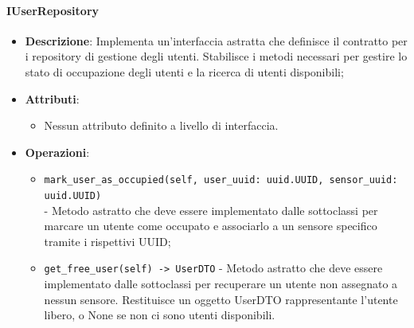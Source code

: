 \documentclass[10pt]{article}
\begin{document}
    \paragraph{IUserRepository}
    \begin{itemize} 
    \item \textbf{Descrizione}: Implementa un'interfaccia astratta che definisce il contratto per i repository di gestione degli utenti. Stabilisce i metodi necessari per gestire lo stato di occupazione degli utenti e la ricerca di utenti disponibili;
    \item \textbf{Attributi}:
    \begin{itemize}
        \item Nessun attributo definito a livello di interfaccia.
    \end{itemize}
    
    \item \textbf{Operazioni}:
    \begin{itemize}
        \item \texttt{mark\_user\_as\_occupied(self, user\_uuid: uuid.UUID, sensor\_uuid: uuid.UUID)}\\ - Metodo astratto che deve essere implementato dalle sottoclassi per marcare un utente come occupato e associarlo a un sensore specifico tramite i rispettivi UUID;
        
        \item \texttt{get\_free\_user(self) -> UserDTO} - Metodo astratto che deve essere implementato dalle sottoclassi per recuperare un utente non assegnato a nessun sensore. Restituisce un oggetto UserDTO rappresentante l'utente libero, o None se non ci sono utenti disponibili.
    \end{itemize}
    \end{itemize}
\end{document}

